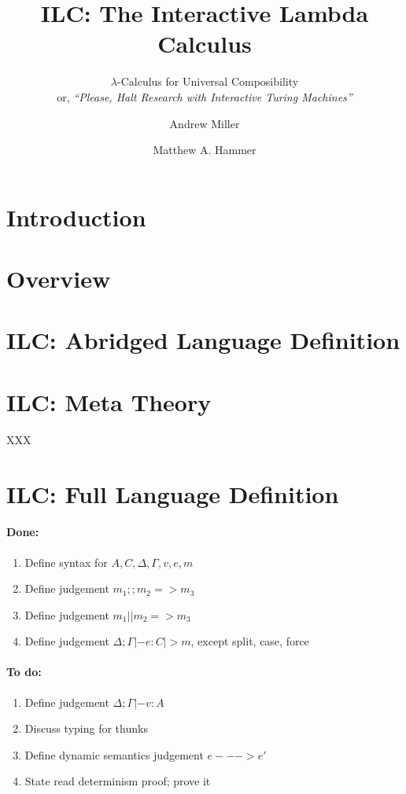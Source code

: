 \documentclass{llncs}
\title{ILC: The Interactive Lambda Calculus}
\subtitle{$\lambda$-Calculus for Universal Composibility
  \\
  or, \emph{``Please, Halt Research with Interactive Turing Machines''}
}
\author{Andrew Miller\inst{1} \and Matthew A. Hammer\inst{2}}
\institute{University of Illinois \and University of Colorado Boulder}
\begin{document}
\maketitle

\begin{abstract}

\end{abstract}

\section{Introduction}

\section{Overview}

\section{ILC: Abridged Language Definition}

\section{ILC: Meta Theory}

\begin{theorem}
\label{thm:read-det}
XXX
\end{theorem}


\appendix
\section{ILC: Full Language Definition}


\paragraph{Done:}
\begin{enumerate}
\item Define syntax for $A, C, \Delta, \Gamma, v, e, m$
\item Define judgement $m_1 ;; m_2 => m_3$
\item Define judgement $m_1 || m_2 => m_3$
\item Define judgement $\Delta; \Gamma |- e : C |> m$, except split, case, force
\end{enumerate}

\paragraph{To do:}
\begin{enumerate}
\item Define judgement $\Delta; \Gamma |- v : A$
\item Discuss typing for thunks
\item Define dynamic semantics judgement $e ---> e'$
\item State read determinism proof; prove it
\end{enumerate}
\end{document}

